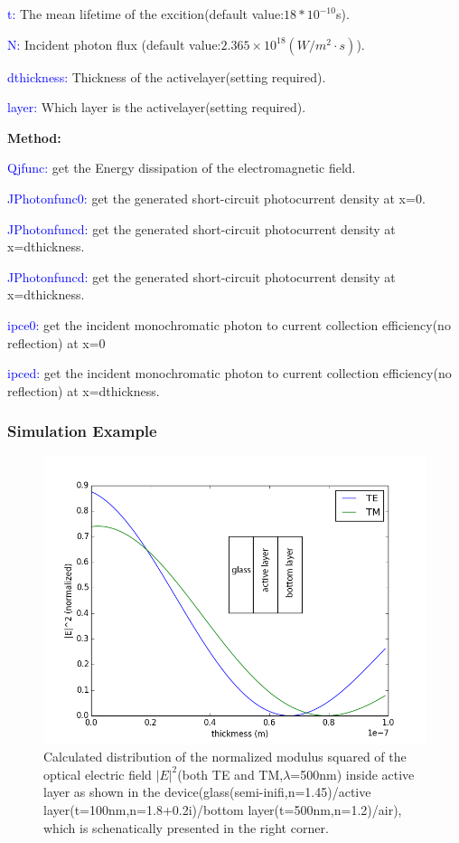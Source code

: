 \documentclass{article}
\begin{document}
\textcolor{blue}{t:} The mean lifetime of the excition(default
value:$18*10^{-10}$s).

\textcolor{blue}{N:} Incident photon flux (default value:$2.365\times
{{10}^{18}}(W/{{m}^{2}}\cdot s)$).

\textcolor{blue}{dthickness:} Thickness of the activelayer(setting required).

\textcolor{blue}{layer:} Which layer is the activelayer(setting required).

\textbf{Method:}

\textcolor{blue}{Qjfunc:} get the Energy dissipation of the electromagnetic
field.

\textcolor{blue}{JPhotonfunc0:} get the generated short-circuit photocurrent
density at x=0.

\textcolor{blue}{JPhotonfuncd:} get the generated short-circuit photocurrent
density at x=dthickness.

\textcolor{blue}{JPhotonfuncd:} get the generated short-circuit photocurrent
density at x=dthickness.

\textcolor{blue}{ipce0:} get the incident monochromatic photon to current
collection efficiency(no reflection) at x=0

\textcolor{blue}{ipced:} get the incident monochromatic photon to current
collection efficiency(no reflection) at x=dthickness.

\subsubsection{Simulation Example}
\begin{figure}[h!]
  \centering
    \includegraphics[width=1\textwidth]{electricfield}
  \caption{Calculated distribution of the normalized modulus squared of the
  optical electric field ${{\left| E \right|}^{2}}$(both TE and
  TM,$\lambda$=500nm) inside active layer as shown in the
  device(glass(semi-inifi,n=1.45)/active layer(t=100nm,n=1.8+0.2i)/bottom
  layer(t=500nm,n=1.2)/air), which is schenatically presented in the right
  corner.
  }
  \label{electricfield}
\end{figure}
\end{document}
